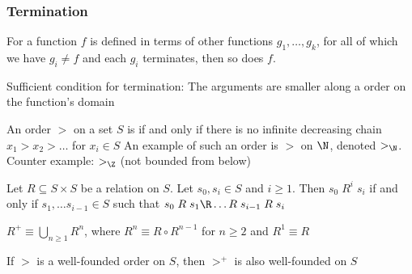 \subsubsection{Termination}
\inlinetheorem For a function $f$ is defined in terms of other functions $g_1, \ldots, g_k$, for all of which we have $g_i \neq f$ and each $g_i$ terminates, then so does $f$.

\inlinelemma Sufficient condition for termination: The arguments are smaller along a  order on the function's domain

 An order $>$ on a set $S$ is  if and only if there is no infinite decreasing chain $x_1 > x_2 > \ldots$ for $x_i \in S$ 
An example of such an order is $>$ on $\N$, denoted $>_\N$. Counter example: $>_\Z$ (not bounded from below)


\inlinelemma Let $R \subseteq S \times S$ be a relation on $S$. Let $s_0, s_i \in S$ and $i \geq 1$.
Then $s_0 \; R^i \; s_i$ if and only if $s_1, \ldots s_{i - 1} \in S$ such that $s_0 \; R \; s_1 \R \ldots R \; s_{i - 1} \; R \; s_i$

\inlinedefinition $R^+ \equiv \bigcup_{n \geq 1} R^n$, where $R^n \equiv R \circ R^{n - 1}$ for $n \geq 2$ and $R^1 \equiv R$

\inlinetheorem If $>$ is a well-founded order on $S$, then $>^+$ is also well-founded on $S$

